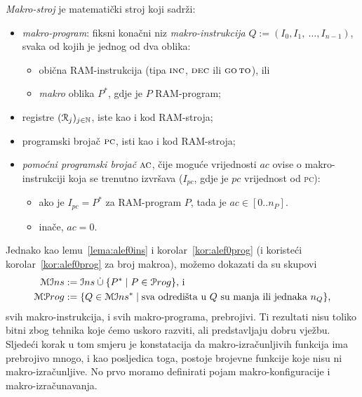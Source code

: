 \begin{definicija}[{name=[makro-stroj]}]
\emph{Makro-stroj} je matematički stroj koji sadrži:
\begin{itemize}
    \item \emph{makro-program}: fiksni konačni niz \emph{makro-instrukcija} $Q:=(I_0, I_1,~\dotsc, I_{n-1})$, svaka od kojih je jednog od dva oblika:
    \begin{itemize}
        \item obična RAM-instrukcija (tipa $\textsc{inc}$, $\textsc{dec}$ ili $\textsc{go\,to}$), ili
        \item  \emph{makro} oblika $P^*$, gdje je $P$ RAM-program;
    \end{itemize}
    \item registre $(\mathcal R_{j})_{j\in{\mathbb N}}$, iste kao i kod RAM-stroja;
    \item programski brojač $\textsc{pc}$, isti kao i kod RAM-stroja;
    \item \emph{pomoćni programski brojač} $\textsc{ac}$, čije  moguće vrijednosti $ac$ ovise o makro-instrukciji koja se trenutno izvršava ($I_{pc}$, gdje je $pc$ vrijednost od \textsc{pc}):
    \begin{itemize}
        \item ako je $I_{pc}=P^*$ za RAM-program $P$, tada je $ac\in[0..n_P]$.
        \item inače, $ac=0$.\qedhere
    \end{itemize}
\end{itemize}
\end{definicija}

Jednako kao lemu~\ref{lema:alef0ins} i korolar~\ref{kor:alef0prog} (i koristeći korolar~\ref{kor:alef0prog} za broj makroa), možemo dokazati da su skupovi
\begin{align}
\mathcal{MI}ns&:=\mathcal Ins\mathbin{\dot\cup}\{P^*\mid P\in\mathcal Prog\}\text{, i}\\
\mathcal{MP}rog&:=\{Q\in\mathcal{MI}ns^*\mid\text{sva odredišta u $Q$ su manja ili jednaka $n_Q$}\}\text,
\end{align}
svih makro-instrukcija, i svih makro-programa, prebrojivi. Ti rezultati nisu toliko bitni zbog tehnika koje ćemo uskoro razviti, ali predstavljaju dobru vježbu. Sljedeći korak u tom smjeru je konstatacija da makro-izračunljivih funkcija ima prebrojivo mnogo, i kao posljedica toga, postoje brojevne funkcije koje nisu ni makro-izračunljive. No prvo moramo definirati pojam makro-konfiguracije i makro-izračunavanja.


